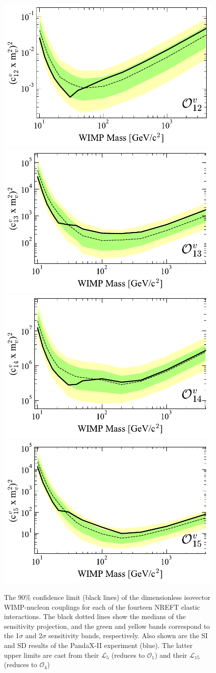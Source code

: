 \documentclass[reprint, showpacs,
preprintnumbers,
amsmath,amssymb,
aps, floatfix,
superscriptaddress,
prd, nofootinbib]{revtex4-1}
\begin{document}
\begin{figure}
    \includegraphics[width=0.5\columnwidth]{SR1_EFT_O12v_c2_lim_Comparison}
    \includegraphics[width=0.5\columnwidth]{SR1_EFT_O13v_c2_lim_Comparison}
    \includegraphics[width=0.5\columnwidth]{SR1_EFT_O14v_c2_lim_Comparison}
    \includegraphics[width=0.5\columnwidth]{SR1_EFT_O15v_c2_lim_Comparison}
    \caption{The 90\% confidence limit (black lines) of the dimensionless isovector WIMP-nucleon couplings for each of the fourteen NREFT elastic interactions.
    The black dotted lines show the medians of the sensitivity projection, and the green and yellow bands correspond to the 1$\sigma$ and 2$\sigma$ sensitivity bands, respectively.
    Also shown are the SI and SD results of the PandaX-II experiment (blue).
    The latter upper limits are cast from their $\mathcal{L}_5$ (reduces to $\mathcal{O}_1$) and their $\mathcal{L}_{15}$ (reduces to $\mathcal{O}_4$)}
  \label{fig:limits-elastic-v}
\end{figure}
\end{document}

